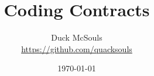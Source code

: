 \documentclass[a4paper,oneside,12pt]{article}
\begin{document}
\title{\Huge\bf Coding Contracts}
\author{%
  Duck McSouls \\
  \url{https://github.com/quacksouls}
}
\date{\today}
\maketitle





























\end{document}
